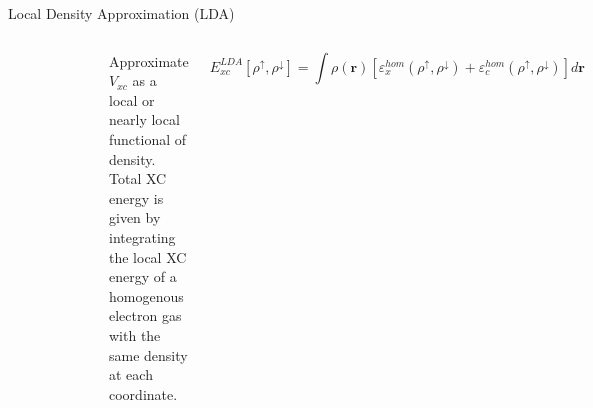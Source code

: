 \documentclass[aspectratio=169]{beamer}
\let \vec \mathbf
\begin{document}
    \begin{frame}{Local Density Approximation (LDA)}

        \begin{columns}
            \begin{figure}
                \centering
                \includegraphics[width=0.8\linewidth]{lectures/figures/5_LDA.png}
            \end{figure}
            Approximate $V_{xc}$ as a local or nearly local functional of density.\newline
            \newline
            Total XC energy is given by integrating the local XC energy of a homogenous electron gas with the same density at each coordinate.

            \begin{equation*}
                E_{xc}^{LDA}[\rho^\uparrow, \rho^\downarrow] = \int \rho(\vec{r})[\varepsilon_x^{hom}(\rho^\uparrow, \rho^\downarrow)+\varepsilon_c^{hom}(\rho^\uparrow, \rho^\downarrow)] d\vec{r}
            \end{equation*}

        \end{columns}

    \end{frame}
\end{document}
